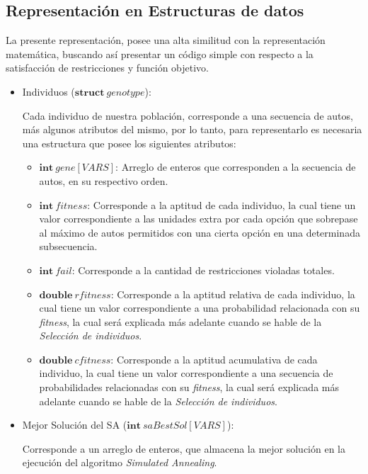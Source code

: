 \subsection{Representación en Estructuras de datos}

La presente representación, posee una alta similitud con la representación matemática, buscando así presentar un código simple
con respecto a la satisfacción de restricciones y función objetivo.

\begin{itemize}
	\item Individuos ($\textbf{struct}\ genotype$):
				
		Cada individuo de nuestra población, corresponde a una secuencia de autos, más algunos atributos del mismo, por lo tanto,
		para representarlo es necesaria una estructura que posee los siguientes atributos:
		\begin{itemize}
			\item $\textbf{int}\ gene[VARS]$: Arreglo de enteros que corresponden  a la secuencia de autos, en su respectivo orden.
			\item $\textbf{int}\ fitness$: Corresponde a la aptitud de cada individuo, la cual tiene un valor correspondiente a las unidades
				extra por cada opción que sobrepase al máximo de autos permitidos con una cierta opción en una determinada subsecuencia.
			\item $\textbf{int}\ fail$: Corresponde a la cantidad de restricciones violadas totales.
			\item $\textbf{double}\ rfitness$: Corresponde a la aptitud relativa de cada individuo, la cual tiene un valor correspondiente
				a una probabilidad relacionada con su \emph{fitness}, la cual será explicada más adelante cuando se hable de la \emph{Selección de
				individuos}.
			\item $\textbf{double}\ cfitness$: Corresponde a la aptitud acumulativa de cada individuo, la cual tiene un valor correspondiente
				a una secuencia de probabilidades relacionadas con su \emph{fitness}, la cual será explicada más adelante cuando se hable de la \emph{Selección
				de individuos}.
		\end{itemize}

	\item Mejor Solución del SA ($\textbf{int}\ saBestSol[VARS]$):

		Corresponde a un arreglo de enteros, que almacena la mejor solución en la ejecución del algoritmo \emph{Simulated Annealing}.
		

\end{itemize}
